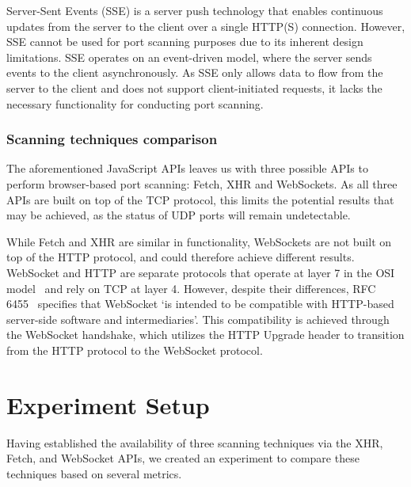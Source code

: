 Server-Sent Events (SSE) is a server push technology that enables continuous updates from the server to the client over a single HTTP(S) connection. However, SSE cannot be used for port scanning purposes due to its inherent design limitations. SSE operates on an event-driven model, where the server sends events to the client asynchronously. As SSE only allows data to flow from the server to the client and does not support client-initiated requests, it lacks the necessary functionality for conducting port scanning.

\subsubsection{Scanning techniques comparison}

The aforementioned JavaScript APIs leaves us with three possible APIs to perform browser-based port scanning: Fetch, XHR and WebSockets. As all three APIs are built on top of the TCP protocol, this limits the potential results that may be achieved, as the status of UDP ports will remain undetectable. 

While Fetch and XHR are similar in functionality, WebSockets are not built on top of the HTTP protocol, and could therefore achieve different results. WebSocket and HTTP are separate protocols that operate at layer 7 in the OSI model~\cite{kumar2014} and rely on TCP at layer 4. However, despite their differences, RFC 6455~\cite{fette2011} specifies that WebSocket `is intended to be compatible with HTTP-based server-side software and intermediaries'. This compatibility is achieved through the WebSocket handshake, which utilizes the HTTP Upgrade header to transition from the HTTP protocol to the WebSocket protocol.

\section{Experiment Setup}

Having established the availability of three scanning techniques via the XHR, Fetch, and WebSocket APIs, we created an experiment to compare these techniques based on several metrics.

